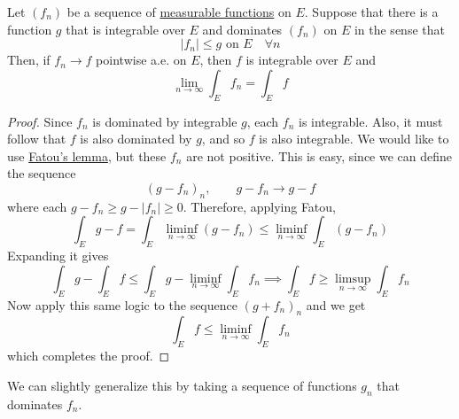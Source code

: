   \begin{theorem}
    \label{thm:dominated-convergence-theorem}
    Let $(f_n)$ be a sequence of \hyperref[def:measurable-function]{measurable functions} on $E$. Suppose that there is a function $g$ that is integrable over $E$ and dominates $(f_n)$ on $E$ in the sense that 
    \begin{equation}
      |f_n| \leq g \text{ on } E \quad \forall n
    \end{equation}
    Then, if $f_n \to f$ pointwise a.e. on $E$, then $f$ is integrable over $E$ and 
    \begin{equation}
      \lim_{n \to \infty} \int_E f_n = \int_E f
    \end{equation}
  \end{theorem}
  \begin{proof}
    Since $f_n$ is dominated by integrable $g$, each $f_n$ is integrable. Also, it must follow that $f$ is also dominated by $g$, and so $f$ is also integrable. We would like to use \hyperref[thm:fatous-lemma]{Fatou's lemma}, but these $f_n$ are not positive. This is easy, since we can define the sequence
    \begin{equation}
      (g - f_n)_n, \qquad g - f_n \to g - f 
    \end{equation}
    where each $g - f_n \geq g - |f_n| \geq 0$. Therefore, applying Fatou, 
    \begin{equation}
      \int_E g - f = \int_E \liminf_{n \to \infty} (g - f_n) \leq \liminf_{n \to \infty} \int_E (g - f_n)
    \end{equation}
    Expanding it gives 
    \begin{equation}
      \int_E g - \int_E f \leq \int_E g - \liminf_{n \to \infty} \int_E f_n \implies \int_E f \geq \limsup_{n \to \infty} \int_E f_n
    \end{equation}
    Now apply this same logic to the sequence $(g + f_n)_n$ and we get 
    \begin{equation}
      \int_E f \leq \liminf_{n \to \infty} \int_E f_n
    \end{equation}
    which completes the proof. 
  \end{proof}

  We can slightly generalize this by taking a sequence of functions $g_n$ that dominates $f_n$. 

